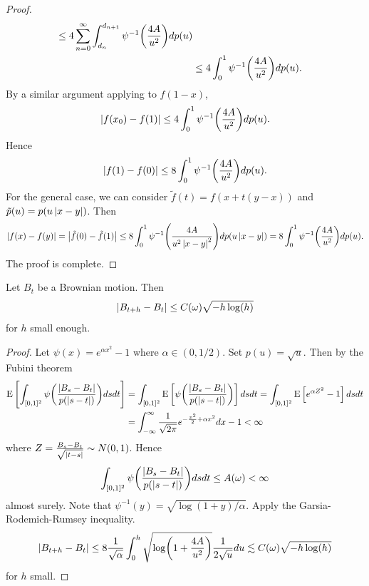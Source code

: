 \begin{proof}
\begin{equation*}
\begin{split}
            \leq 4\sum_{n=0}^\infty \int_{d_n}^{d_{n+1}}\psi^{-1}\pth{\frac{4A}{u^2}}dp(u) \\
            &\leq 4\int_{0}^{1}\psi^{-1}\pth{\frac{4A}{u^2}}dp(u).
        \end{split}
    \end{equation*}
    By a similar argument applying to $f(1-x)$, 
    \begin{equation*}
        \abs{f(x_0)-f(1)} \leq 4\int_{0}^{1}\psi^{-1}\pth{\frac{4A}{u^2}}dp(u). 
    \end{equation*}
    Hence 
    \begin{equation*}
        \abs{f(1)-f(0)} \leq 8\int_{0}^{1}\psi^{-1}\pth{\frac{4A}{u^2}}dp(u).
    \end{equation*}
    For the general case, we can consider $\tilde{f}(t) = f(x+t(y-x))$ and 
    $\tilde{p}(u) = p(u\left\lvert {x-y} \right\rvert)$. Then 
    \begin{equation*}
        \abs{f(x)-f(y)} = \abs{\tilde{f}(0)-\tilde{f}(1)} \leq 8\int_{0}^{1}\psi^{-1}\pth{\frac{4A}{u^2\abs{x-y}^2}}dp(u\abs{x-y})
        = 8\int_{0}^{1}\psi^{-1}\pth{\frac{4A}{u^2}}dp(u). 
    \end{equation*}
    The proof is complete. 
\end{proof}

\begin{proposition}
    Let $B_t$ be a Brownian motion. Then 
    \begin{equation*}
        \left\lvert {B_{t+h}-B_t} \right\rvert \leq C(\omega)\sqrt{-h\log(h)}
    \end{equation*} 
    for $h$ small enough. 
\end{proposition}
\begin{proof}
    Let $\psi(x) = e^{\alpha x^2}-1$ where $\alpha\in (0,1/2)$. 
    Set $p(u) =\sqrt{u}$. Then by the Fubini theorem
    \begin{equation*}
        \begin{split}
            \E\sbrc{\int_{[0,1]^2}\psi\pth{\frac{\abs{B_s-B_t}}{p(\abs{s-t})}}dsdt} 
            &= \int_{[0,1]^2}\E\sbrc{\psi\pth{\frac{\abs{B_s-B_t}}{p(\abs{s-t})}}}dsdt 
            = \int_{[0,1]^2}\E\sbrc{e^{\alpha Z^2}-1}dsdt \\
            &= \int_{-\infty}^\infty \frac{1}{\sqrt{2\pi}}e^{-\frac{x^2}{2}+\alpha x^2}dx-1< \infty
        \end{split}
    \end{equation*}
    where $Z = \frac{B_s-B_t}{\sqrt{\left\lvert {t-s} \right\rvert}}\sim N(0,1)$. 
    Hence 
    \begin{equation*}
        \int_{[0,1]^2}\psi\pth{\frac{\abs{B_s-B_t}}{p(\abs{s-t})}}dsdt \leq A(\omega)<\infty
    \end{equation*}
    almost surely. Note that $\psi^{-1}(y) = \sqrt{\log(1+y)/\alpha}$. 
    Apply the Garsia-Rodemich-Rumsey inequality. 
    \begin{equation*}
        \abs{B_{t+h}-B_t} \leq 8\frac{1}{\sqrt{\alpha}}\int_0^{h}\sqrt{\log\pth{1+\frac{4A}{u^2}}}\frac{1}{2\sqrt{u}}du
        \lesssim C(\omega)\sqrt{-h\log(h)}
    \end{equation*}
    for $h$ small. 
\end{proof}

